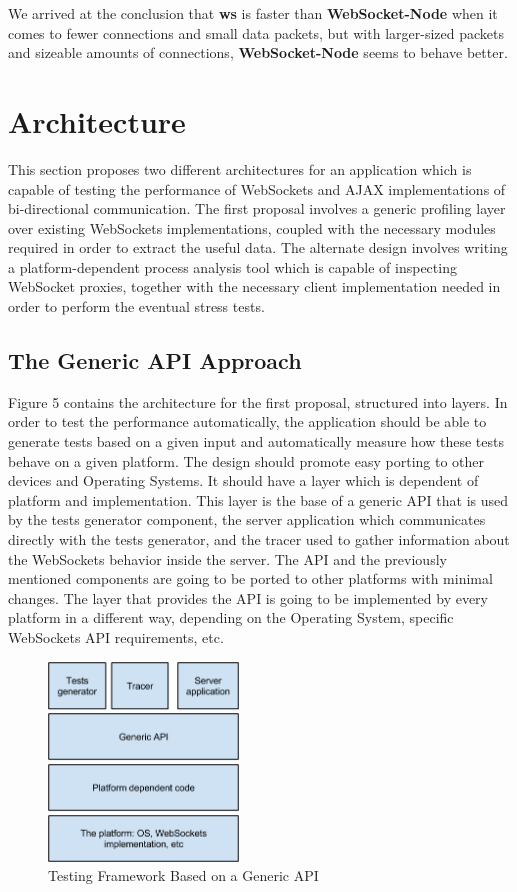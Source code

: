 \documentclass[conference]{IEEEtran}
\begin{document}
We arrived at the conclusion that \textbf{ws} is faster than
\textbf{WebSocket-Node} when it comes to fewer connections and small data
packets, but with larger-sized packets and sizeable amounts of connections,
\textbf{WebSocket-Node} seems to behave better.

\section{Architecture}
This section proposes two different architectures for an application which is capable
of testing the performance of WebSockets and AJAX implementations of bi-directional
communication. The first proposal involves a generic profiling layer over
existing WebSockets implementations, coupled with the necessary modules required
in order to extract the useful data. The alternate design involves writing a
platform-dependent process analysis tool which is capable of inspecting WebSocket
proxies, together with the necessary client implementation needed in order to
perform the eventual stress tests.

\subsection{The Generic API Approach}
Figure 5 contains the architecture for the first proposal, structured into
layers. In order to test the performance automatically, the application should
be able to generate tests based on a given input and automatically measure how
these tests behave on a given platform. The design should promote easy porting
to other devices and Operating Systems. It should have a layer which is dependent
of platform and implementation. This layer is the base of a generic API that is
used by the tests generator component, the server application which communicates
directly with the tests generator, and the tracer used to gather information
about the WebSockets behavior inside the server. The API and the previously
mentioned components are going to be ported to other platforms with minimal
changes. The layer that provides the API is going to be implemented by every
platform in a different way, depending on the Operating System, specific
WebSockets API requirements, etc.
\begin{frame}{}
  \begin{figure}
    \centering
    \includegraphics[width=0.45\textwidth]{img/architecture1.png}
    \caption{Testing Framework Based on a Generic API}
  \end{figure}
\end{frame}
\\
\end{document}
